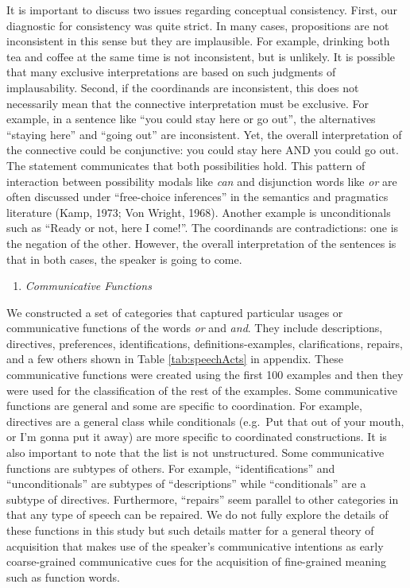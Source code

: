 \documentclass[,man,floatsintext]{apa6}
\providecommand{\tightlist}{%
  \setlength{\itemsep}{0pt}\setlength{\parskip}{0pt}}
\begin{document}
It is important to discuss two issues regarding conceptual consistency. First, our diagnostic for consistency was quite strict. In many cases, propositions are not inconsistent in this sense but they are implausible. For example, drinking both tea and coffee at the same time is not inconsistent, but is unlikely. It is possible that many exclusive interpretations are based on such judgments of implausability. Second, if the coordinands are inconsistent, this does not necessarily mean that the connective interpretation must be exclusive. For example, in a sentence like \enquote{you could stay here or go out}, the alternatives \enquote{staying here} and \enquote{going out} are inconsistent. Yet, the overall interpretation of the connective could be conjunctive: you could stay here AND you could go out. The statement communicates that both possibilities hold. This pattern of interaction between possibility modals like \emph{can} and disjunction words like \emph{or} are often discussed under \enquote{free-choice inferences} in the semantics and pragmatics literature (Kamp, 1973; Von Wright, 1968). Another example is unconditionals such as \enquote{Ready or not, here I come!}. The coordinands are contradictions: one is the negation of the other. However, the overall interpretation of the sentences is that in both cases, the speaker is going to come.

\begin{enumerate}
\def\labelenumi{\arabic{enumi}.}
\setcounter{enumi}{4}
\tightlist
\item
  \emph{Communicative Functions}
\end{enumerate}

We constructed a set of categories that captured particular usages or communicative functions of the words \emph{or} and \emph{and}. They include descriptions, directives, preferences, identifications, definitions-examples, clarifications, repairs, and a few others shown in Table \ref{tab:speechActs} in appendix. These communicative functions were created using the first 100 examples and then they were used for the classification of the rest of the examples. Some communicative functions are general and some are specific to coordination. For example, directives are a general class while conditionals (e.g.~Put that out of your mouth, or I'm gonna put it away) are more specific to coordinated constructions. It is also important to note that the list is not unstructured. Some communicative functions are subtypes of others. For example, \enquote{identifications} and \enquote{unconditionals} are subtypes of \enquote{descriptions} while \enquote{conditionals} are a subtype of directives. Furthermore, \enquote{repairs} seem parallel to other categories in that any type of speech can be repaired. We do not fully explore the details of these functions in this study but such details matter for a general theory of acquisition that makes use of the speaker's communicative intentions as early coarse-grained communicative cues for the acquisition of fine-grained meaning such as function words.
\end{document}
